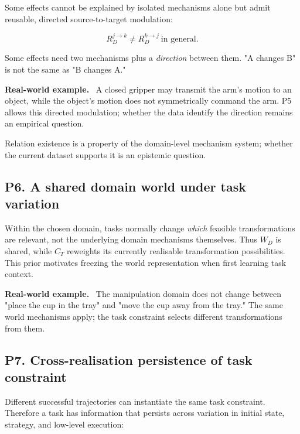 \documentclass[11pt]{article}
\newenvironment{plainword}{%
  \par\medskip\noindent\begin{minipage}{\textwidth}%
  \color{gray!75!black}\small\itshape
}{%
  \end{minipage}\par\medskip}
\newenvironment{example}{%
  \par\smallskip\noindent\begin{minipage}{\textwidth}%
  \color{teal!60!black}\small
  \textbf{\color{teal!70!black}Real-world example.}\
}{%
  \end{minipage}\par\smallskip}
\begin{document}
Some effects cannot be explained by isolated mechanisms alone but admit reusable, directed source-to-target modulation:

\[
\boxed{R_D^{j\rightarrow k}\neq R_D^{k\rightarrow j}\ \text{in general}.}
\]

\begin{plainword}
Some effects need two mechanisms plus a \emph{direction} between them. "A changes B" is not the same as "B changes A."
\end{plainword}

\begin{example}
A closed gripper may transmit the arm's motion to an object, while the object's motion does not symmetrically command the arm. P5
allows this directed modulation; whether the data identify the direction remains an empirical question.
\end{example}

Relation existence is a property of the domain-level mechanism system; whether the current dataset supports it is an epistemic
question.

\subsection*{P6. A shared domain world under task variation}

Within the chosen domain, tasks normally change \emph{which} feasible transformations are relevant, not the underlying domain
mechanisms themselves. Thus $W_D$ is shared, while $C_T$ reweights its currently realisable transformation possibilities. This prior
motivates freezing the world representation when first learning task context.

\begin{example}
The manipulation domain does not change between "place the cup in the tray" and "move the cup away from the tray." The same world
mechanisms apply; the task constraint selects different transformations from them.
\end{example}

\subsection*{P7. Cross-realisation persistence of task constraint}

Different successful trajectories can instantiate the same task constraint. Therefore a task has information that persists across
variation in initial state, strategy, and low-level execution:
\end{document}
